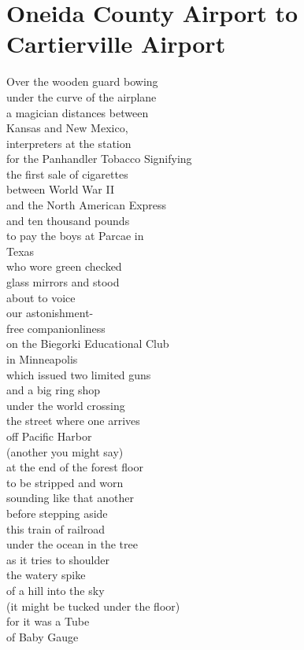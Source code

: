 \documentclass[smalldemyvopaper,11pt,twoside,onecolumn,openright,extrafontsizes]{memoir}
\begin{document}
\chapter{Oneida County Airport to Cartierville Airport}
Over the wooden guard bowing
\\under the curve of the airplane
\\a magician distances between
\\Kansas and New Mexico,
\\interpreters at the station
\\for the Panhandler Tobacco Signifying
\\the first sale of cigarettes
\\between World War II
\\and the North American Express
\\and ten thousand pounds
\\to pay the boys at Parcae in
\\Texas
\\who wore green checked
\\glass mirrors and stood
\\about to voice
\\our astonishment-
\\free companionliness
\\on the Biegorki Educational Club
\\in Minneapolis
\\which issued two limited guns
\\and a big ring shop
\\under the world crossing
\\the street where one arrives
\\off Pacific Harbor
\\(another you might say)
\\at the end of the forest floor
\\to be stripped and worn
\\sounding like that another
\\before stepping aside
\\this train of railroad
\\under the ocean in the tree
\\as it tries to shoulder
\\the watery spike
\\of a hill into the sky
\\(it might be tucked under the floor)
\\for it was a Tube
\\of Baby Gauge
\end{document}
